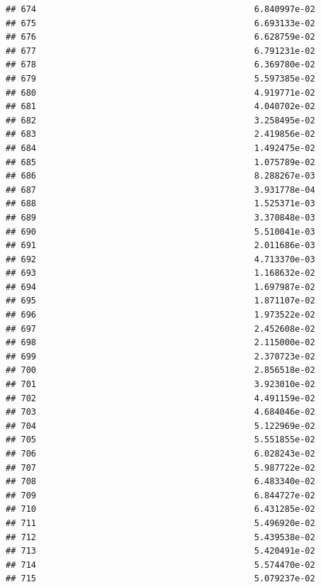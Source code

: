 \documentclass[
]{article}
\begin{document}
\begin{verbatim}
## 674                                           6.840997e-02
## 675                                           6.693133e-02
## 676                                           6.628759e-02
## 677                                           6.791231e-02
## 678                                           6.369780e-02
## 679                                           5.597385e-02
## 680                                           4.919771e-02
## 681                                           4.040702e-02
## 682                                           3.258495e-02
## 683                                           2.419856e-02
## 684                                           1.492475e-02
## 685                                           1.075789e-02
## 686                                           8.288267e-03
## 687                                           3.931778e-04
## 688                                           1.525371e-03
## 689                                           3.370848e-03
## 690                                           5.510041e-03
## 691                                           2.011686e-03
## 692                                           4.713370e-03
## 693                                           1.168632e-02
## 694                                           1.697987e-02
## 695                                           1.871107e-02
## 696                                           1.973522e-02
## 697                                           2.452608e-02
## 698                                           2.115000e-02
## 699                                           2.370723e-02
## 700                                           2.856518e-02
## 701                                           3.923010e-02
## 702                                           4.491159e-02
## 703                                           4.684046e-02
## 704                                           5.122969e-02
## 705                                           5.551855e-02
## 706                                           6.028243e-02
## 707                                           5.987722e-02
## 708                                           6.483340e-02
## 709                                           6.844727e-02
## 710                                           6.431285e-02
## 711                                           5.496920e-02
## 712                                           5.439538e-02
## 713                                           5.420491e-02
## 714                                           5.574470e-02
## 715                                           5.079237e-02

\end{verbatim}
\end{document}

